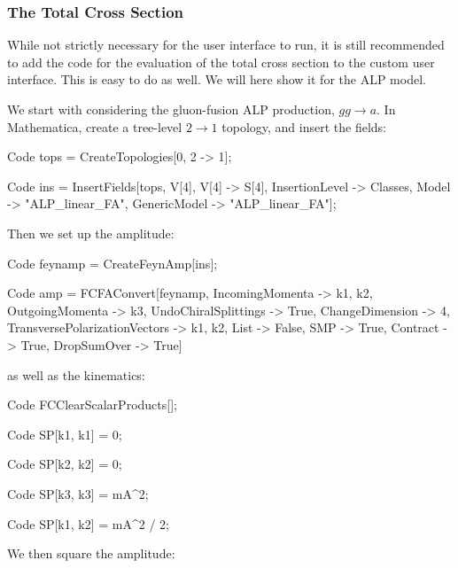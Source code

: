 \documentclass[12pt]{article}
\begin{document}
\subsubsection{The Total Cross Section} \label{sec:alptotxsec} 
While not strictly necessary for the user interface to run, it is still recommended to add the code for the evaluation of the total cross section to the custom user interface. This is easy to do as well. We will here show it for the ALP model. 

We start with considering the gluon-fusion ALP production, $gg \rightarrow a$. In Mathematica, create a tree-level $2 \rightarrow 1$ topology, and insert the fields: 
\begin{mmaCell}{Code}
tops = CreateTopologies[0, 2 -> 1];
\end{mmaCell}
\begin{mmaCell}{Code}
ins = InsertFields[tops, {V[4], V[4]} -> {S[4]}, InsertionLevel -> {Classes}, Model -> "ALP_linear_FA", GenericModel -> "ALP_linear_FA"];
\end{mmaCell}
Then we set up the amplitude: 
\begin{mmaCell}{Code}
feynamp = CreateFeynAmp[ins]; 
\end{mmaCell}
\begin{mmaCell}{Code}
amp = FCFAConvert[feynamp, IncomingMomenta -> {k1, k2}, 
                  OutgoingMomenta -> {k3}, UndoChiralSplittings -> True, 
                  ChangeDimension -> 4, TransversePolarizationVectors -> {k1, k2}, 
                  List -> False, SMP -> True, Contract -> True, DropSumOver -> True] 
\end{mmaCell}
as well as the kinematics: 
\begin{mmaCell}{Code}
FCClearScalarProducts[]; 
\end{mmaCell}
\begin{mmaCell}{Code}
SP[k1, k1] = 0; 
\end{mmaCell}
\begin{mmaCell}{Code}
SP[k2, k2] = 0; 
\end{mmaCell}
\begin{mmaCell}{Code}
SP[k3, k3] = mA^2; 
\end{mmaCell}
\begin{mmaCell}{Code}
SP[k1, k2] = mA^2 / 2; 
\end{mmaCell}
We then square the amplitude: 
\end{document}
